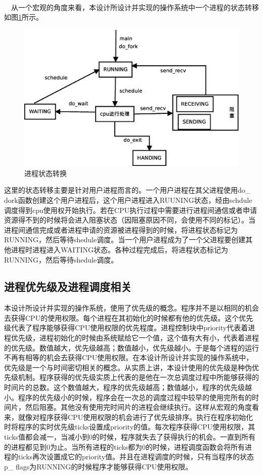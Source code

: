 \documentclass[UTF8,nofonts,cs4size]{ctexrep}
\begin{document}
\paragraph{}
\indent \ \ 
从一个宏观的角度来看，本设计所设计并实现的操作系统中一个进程的状态转移如图\ref{procstatus}所示。

\begin{figure}[htp]
\centering
\includegraphics[scale=0.4]{procstatus.eps}
\caption{进程状态转换}
\label{procstatus}
\end{figure}

这里的状态转移主要是针对用户进程而言的。一个用户进程在其父进程使用do\_ dork函数创建这个用户进程后，这个用户进程进入RUUNING状态，经由schdule调度得到cpu使用权开始执行。若在CPU执行过程中需要进行进程间通信或者申请资源得不到的时候将会进入阻塞状态（因阻塞原因不同，会使用不同的标记）。当进程间通信完成或者进程申请的资源被进程得到的时候，将进程状态标记为RUNNING，然后等待shedule调度。当一个用户进程成为了一个父进程要创建其他进程时进程进入WAITING状态。各种过程完成后，将进程状态标记为RUNNING，然后等待shedule调度。
\subsection{进程优先级及进程调度相关}
本设计所设计并实现的操作系统，使用了优先级的概念。程序并不是以相同的机会去获得CPU的使用权限。每个进程在其初始化的时候都有他的优先级。这个优先级代表了程序能够获得CPU使用权限的优先程度。进程控制块中priority代表着进程优先级，进程初始化的时候由系统赋给它一个值，这个值有大有小，代表着进程的优先级。数值越大，优先级越高；数值越小，优先级越小。于是每个进程的运行不再有相等的机会去获得CPU使用权限。在本设计所设计并实现的操作系统中，优先级是一个与时间密切相关的概念。从实质上讲，本设计使用的优先级是种伪优先级机制。程序获得的优先级实质上代表的是他在一次总调度过程中所能够获得的时间片的总数。这个数值越大，程序的优先级越高；数值越小，程序的优先级越小。程序的优先级小的时候，程序会在一次总的调度过程中较早的使用完所有的时间片，然后阻塞。其他没有使用完时间片的进程会继续执行。这样从宏观的角度看来，就像对程序获得CPU使用权限的机会进行了优先级排序。执行在程序初始化时将程序的实时优先级ticks设置成priority的值。每次程序获得CPU使用权限，其ticks值都会减一，当减小到0的时候，程序就失去了获得执行的机会。一直到所有的进程都见到0为止。当所有进程的ticks都为0的时候，进程调度函数会将所有进程的ticks再次设置成它的priority值。并且在进程调度的时候，只有当程序的状态p\_ flags为RUNNING的时候程序才能够获得CPU使用权限。
\end{document}
